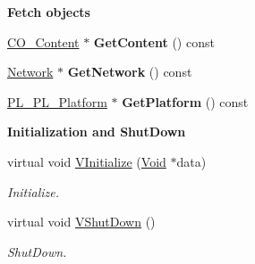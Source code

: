 \begin{Indent}{\bf Fetch objects}\par
{\em \label{_amgrp3c854b4b8917696ee3112e6c72a3b2ad}
 }\begin{DoxyCompactItemize}
\item 
\hypertarget{classFramework_1_1App_af821ad87109e0077c144c5a2f5d2b933}{
\hyperlink{classContent_1_1Content}{CO\_\-Content} $\ast$ {\bfseries GetContent} () const }
\label{classFramework_1_1App_af821ad87109e0077c144c5a2f5d2b933}

\item 
\hypertarget{classFramework_1_1App_a7394060da20bff136ca98c6307afbf47}{
\hyperlink{classNetwork}{Network} $\ast$ {\bfseries GetNetwork} () const }
\label{classFramework_1_1App_a7394060da20bff136ca98c6307afbf47}

\item 
\hypertarget{classFramework_1_1App_a4c9f8af5d1bbf5a96481cc4b4b512b66}{
\hyperlink{classPlatform_1_1Platform_1_1Platform}{PL\_\-PL\_\-Platform} $\ast$ {\bfseries GetPlatform} () const }
\label{classFramework_1_1App_a4c9f8af5d1bbf5a96481cc4b4b512b66}

\end{DoxyCompactItemize}
\end{Indent}
\begin{Indent}{\bf Initialization and ShutDown}\par
{\em \label{_amgrp2a8ba145c14f2dcb11ba0fe271240078}
 }\begin{DoxyCompactItemize}
\item 
\hypertarget{classFramework_1_1App_ae3175c55a4796e96383062e93647ad8e}{
virtual void \hyperlink{classFramework_1_1App_ae3175c55a4796e96383062e93647ad8e}{VInitialize} (\hyperlink{structVoid}{Void} $\ast$data)}
\label{classFramework_1_1App_ae3175c55a4796e96383062e93647ad8e}

\begin{DoxyCompactList}\small\item\em Initialize. \item\end{DoxyCompactList}\item 
\hypertarget{classFramework_1_1App_a39a0de46f9dfb245b4f9d03ef724a08c}{
virtual void \hyperlink{classFramework_1_1App_a39a0de46f9dfb245b4f9d03ef724a08c}{VShutDown} ()}
\label{classFramework_1_1App_a39a0de46f9dfb245b4f9d03ef724a08c}

\begin{DoxyCompactList}\small\item\em ShutDown. \item\end{DoxyCompactList}\end{DoxyCompactItemize}
\end{Indent}
